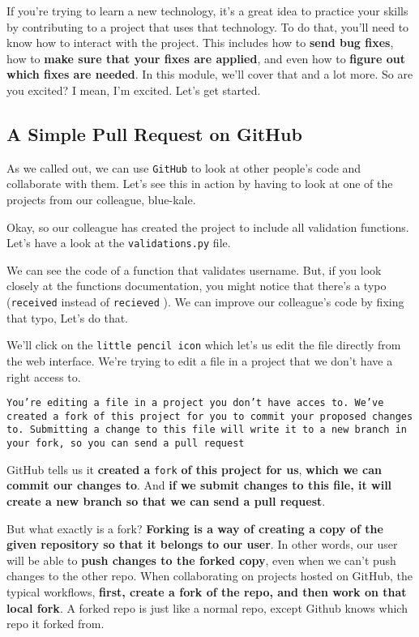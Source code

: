 	If you're trying to learn a new technology, it's a great idea to practice your skills by contributing to a project that uses that technology. To do that, you'll need to know how to interact with the project. 
	This includes how to \textbf{send bug fixes}, how to \textbf{make sure that your fixes are applied}, and even how to \textbf{figure out which fixes are needed}. In this module, we'll cover that and a lot more. So are you excited? I mean, I'm excited. Let's get started.
	
	\subsection{A Simple Pull Request on GitHub}
	
	As we called out, we can use \texttt{GitHub} to look at other people's code and collaborate with them. Let's see this in action by having to look at one of the projects from our colleague, blue-kale.
	
	Okay, so our colleague has created the project to include all validation functions. Let's have a look at the \verb|validations.py| file.
	
	We can see the code of a function that validates username. But, if you look closely at the functions documentation, you might notice that there's a typo (\texttt{received} instead of \texttt{recieved} ). We can improve our colleague's code by fixing that typo, Let's do that. 
	
	We'll click on the \texttt{little pencil icon} which let's us edit the file directly from the web interface. We're trying to edit a file in a project that we don't have a right access to. 
	
	\texttt{You're editing a file in a project you don't have acces to. We've created a fork of this project for you to commit your proposed changes to. Submitting a change to this file will write it to a new branch in your fork, so you can send a pull request}
	
	GitHub tells us it \textbf{created a} \texttt{fork} \textbf{of this project for us}, \textbf{which we can commit our changes to}. And\textbf{ if we submit changes to this file, it will create a new branch so that we can send a pull request}. 
	
	But what exactly is a fork? \textbf{Forking is a way of creating a copy of the given repository so that it belongs to our user}. In other words, our user will be able to \textbf{push changes to the forked copy}, even when we can't push changes to the other repo. 
	When collaborating on projects hosted on GitHub, the typical workflows, \textbf{first, create a fork of the repo, and then work on that local fork}. A forked repo is just like a normal repo, except Github knows which repo it forked from. 
	
